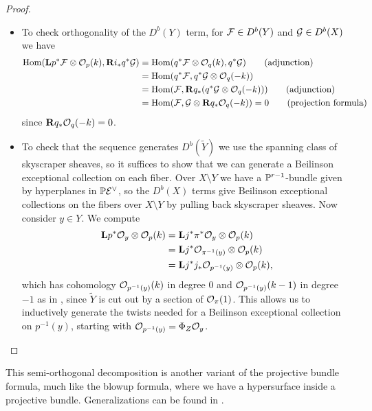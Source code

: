 \begin{proof}
\begin{itemize}
        \item To check orthogonality of the $D^b(Y)$ term, for $\calF\in D^b(Y)$
            and $\calG\in D^b(X)$ we have
            \begin{align*}
                \Hom(\dL p^*\calF\otimes\O_p(k),\dR i_*q^*\calG)
                    &= \Hom(q^*\calF\otimes\O_q(k),q^*\calG)
                    \qquad \text{(adjunction)} \\
                    &= \Hom(q^*\calF,q^*\calG\otimes\O_q(-k)) \\
                    &= \Hom(\calF,\dR q_*(q^*\calG\otimes\O_q(-k)))
                    \qquad \text{(adjunction)} \\
                    &= \Hom(\calF,\calG\otimes\dR q_*\O_q(-k))
                    = 0 \qquad \text{(projection formula)}
            \end{align*}
            since $\dR q_*\O_q(-k)=0$.

        \item To check that the sequence generates $D^b(\tilde Y)$ we use the
            spanning class of skyscraper sheaves, so it suffices to show that we
            can generate a Beilinson exceptional collection on each fiber. Over
            $X\setminus Y$ we have a $\P^{r-1}$-bundle given by hyperplanes in
            $\P\calE^\vee$, so the $D^b(X)$ terms give Beilinson exceptional
            collections on the fibers over $X\setminus Y$ by pulling back
            skyscraper sheaves.
            Now consider $y\in Y$. We compute
            \begin{align*}
                \dL p^*\O_y\otimes\O_p(k)
                    &= \dL j^*\pi^*\O_y\otimes\O_p(k) \\
                    &= \dL j^*\O_{\pi^{-1}(y)}\otimes\O_p(k) \\
                    &= \dL j^*j_*\O_{p^{-1}(y)}\otimes\O_p(k),
            \end{align*}
            which has cohomology $\O_{p^{-1}(y)}(k)$ in degree 0 and
            $\O_{p^{-1}(y)}(k-1)$ in degree $-1$ as in
            \cite[Cor 11.4]{Huybrechts}, since $\tilde Y$ is cut out by a
            section of $\O_\pi(1)$. This allows us to inductively generate the
            twists needed for a Beilinson exceptional collection on $p^{-1}(y)$,
            starting with $\O_{p^{-1}(y)}=\Phi_Z\O_y$.
    \end{itemize}
\end{proof}

\begin{remark}{}{}
    This semi-orthogonal decomposition is another variant of the projective
    bundle formula, much like the blowup formula, where we have a hypersurface
    inside a projective bundle. Generalizations can be found in
    \cite{kuznetsov_hpd_2005}.
\end{remark}

